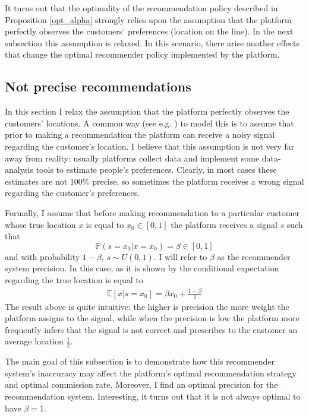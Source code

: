 \documentclass[a4paper]{article}
\begin{document}
It turns out that the optimality of the recommendation policy described in Proposition \ref{opt_alpha} strongly relies upon the assumption that the platform perfectly observes the customers' preferences (location on the line). In the next subsection this assumption is relaxed. In this scenario, there arise another effects that change the optimal recommender policy implemented by the platform.

\subsection{Not precise recommendations}
In this section I relax the assumption that the platform perfectly observes the customers' locations. A common way (see e.g. \cite{lewis1994supplying} ) to model this is to assume that prior to making a recommendation the platform can receive a noisy signal regarding the customer's location. I believe that this assumption is not very far away from reality: usually platforms collect data and implement some data-analysis tools to estimate people's preferences. Clearly, in most cases these estimates are not 100\% precise, so sometimes the platform receives a wrong signal regarding the customer's preferences.




Formally, I assume that before making recommendation to a particular customer whose true location $x$ is equal to $x_0 \in [0, 1]$ the platform receives a signal $s$ such that $$\mathbb{P}(s=x_0|x=x_0) = \beta \in [0, 1]$$ and with probability $1-\beta$, $s \sim U(0, 1)$. I will refer to $\beta$ as the recommender system precision. In this case, as it is shown by \cite{li2018recommender} the conditional expectation regarding the true location is equal to \begin{align}\label{signal}
\mathbb{E}[x|s=x_0] = \beta x_0 + \frac{1-\beta}{2}
\end{align}
The result above is quite intuitive: the higher is precision the more weight the platform assigns to the signal, while when the precision is low the platform more frequently infers that the signal is not correct and prescribes to the customer an average location $\frac{1}{2}$. 


The main goal of this subsection is to demonstrate how this recommender system's inaccuracy may affect the platform's optimal recommendation strategy and optimal commission rate. Moreover, I find an optimal precision for the recommendation system. Interesting, it turns out that it is not always optimal to have $\beta = 1$.
\end{document}
